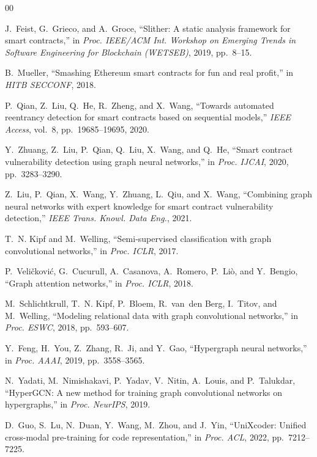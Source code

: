 \documentclass[conference]{IEEEtran}
\begin{document}
\begin{thebibliography}{00}

J.~Feist, G.~Grieco, and A.~Groce, ``Slither: A static analysis framework for smart
contracts,'' in \emph{Proc. IEEE/ACM Int. Workshop on Emerging Trends in Software
Engineering for Blockchain (WETSEB)}, 2019, pp.~8--15.

B.~Mueller, ``Smashing Ethereum smart contracts for fun and real profit,'' in
\emph{HITB SECCONF}, 2018.

P.~Qian, Z.~Liu, Q.~He, R.~Zheng, and X.~Wang, ``Towards automated reentrancy
detection for smart contracts based on sequential models,'' \emph{IEEE Access},
vol.~8, pp.~19685--19695, 2020.

Y.~Zhuang, Z.~Liu, P.~Qian, Q.~Liu, X.~Wang, and Q.~He, ``Smart contract
vulnerability detection using graph neural networks,'' in \emph{Proc. IJCAI}, 2020,
pp.~3283--3290.

Z.~Liu, P.~Qian, X.~Wang, Y.~Zhuang, L.~Qiu, and X.~Wang, ``Combining graph neural
networks with expert knowledge for smart contract vulnerability detection,''
\emph{IEEE Trans. Knowl. Data Eng.}, 2021.

T.~N. Kipf and M.~Welling, ``Semi-supervised classification with graph convolutional
networks,'' in \emph{Proc. ICLR}, 2017.

P.~Veli\v{c}kovi\'c, G.~Cucurull, A.~Casanova, A.~Romero, P.~Li\`o, and Y.~Bengio,
``Graph attention networks,'' in \emph{Proc. ICLR}, 2018.

M.~Schlichtkrull, T.~N. Kipf, P.~Bloem, R.~van~den Berg, I.~Titov, and M.~Welling,
``Modeling relational data with graph convolutional networks,'' in \emph{Proc. ESWC},
2018, pp.~593--607.

Y.~Feng, H.~You, Z.~Zhang, R.~Ji, and Y.~Gao, ``Hypergraph neural networks,'' in
\emph{Proc. AAAI}, 2019, pp.~3558--3565.

N.~Yadati, M.~Nimishakavi, P.~Yadav, V.~Nitin, A.~Louis, and P.~Talukdar,
``HyperGCN: A new method for training graph convolutional networks on hypergraphs,''
in \emph{Proc. NeurIPS}, 2019.

D.~Guo, S.~Lu, N.~Duan, Y.~Wang, M.~Zhou, and J.~Yin, ``UniXcoder: Unified
cross-modal pre-training for code representation,'' in \emph{Proc. ACL}, 2022,
pp.~7212--7225.


\end{thebibliography}
\end{document}
